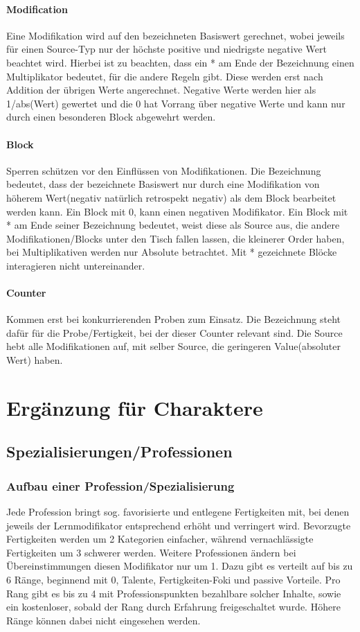 \documentclass[a4paper,12pt,oneside]{book}
\begin{document}
\subsection{Modification}
Eine Modifikation wird auf den bezeichneten Basiswert gerechnet, wobei jeweils für einen Source-Typ nur der höchste positive und niedrigste negative Wert beachtet wird. Hierbei ist zu beachten, dass ein * am Ende der Bezeichnung einen Multiplikator bedeutet, für die andere Regeln gibt. Diese werden erst nach Addition der übrigen Werte angerechnet. Negative Werte werden hier als 1/abs(Wert) gewertet und die 0 hat Vorrang über negative Werte und kann nur durch einen besonderen Block abgewehrt werden.
\subsection{Block}
Sperren schützen vor den Einflüssen von Modifikationen. Die Bezeichnung bedeutet, dass der bezeichnete Basiswert nur durch eine Modifikation von höherem Wert(negativ natürlich retrospekt negativ) als dem Block bearbeitet werden kann. Ein Block mit 0, kann einen negativen Modifikator. Ein Block mit * am Ende seiner Bezeichnung bedeutet, weist diese als Source aus, die andere Modifikationen/Blocks unter den Tisch fallen lassen, die kleinerer Order haben, bei Multiplikativen werden nur Absolute betrachtet. Mit * gezeichnete Blöcke interagieren nicht untereinander.
\subsection{Counter}
Kommen erst bei konkurrierenden Proben zum Einsatz. Die Bezeichnung steht dafür für die Probe/Fertigkeit, bei der dieser Counter relevant sind. Die Source hebt alle Modifikationen auf, mit selber Source, die geringeren Value(absoluter Wert) haben.

\part{Ergänzung für Charaktere}
\setcounter{chapter}{0}

\chapter{Spezialisierungen/Professionen}
\section{Aufbau einer Profession/Spezialisierung}
Jede Profession bringt sog. favorisierte und entlegene Fertigkeiten mit, bei denen jeweils der Lernmodifikator entsprechend erhöht und verringert wird. Bevorzugte Fertigkeiten werden um 2 Kategorien einfacher, während vernachlässigte Fertigkeiten um 3 schwerer werden. Weitere Professionen ändern bei Übereinstimmungen diesen Modifikator nur um 1.
Dazu gibt es verteilt auf bis zu 6 Ränge, beginnend mit 0, Talente, Fertigkeiten-Foki und passive Vorteile.
Pro Rang gibt es bis zu 4 mit Professionspunkten bezahlbare solcher Inhalte, sowie ein kostenloser, sobald der Rang durch Erfahrung freigeschaltet wurde. Höhere Ränge können dabei nicht eingesehen werden.  
\end{document}
